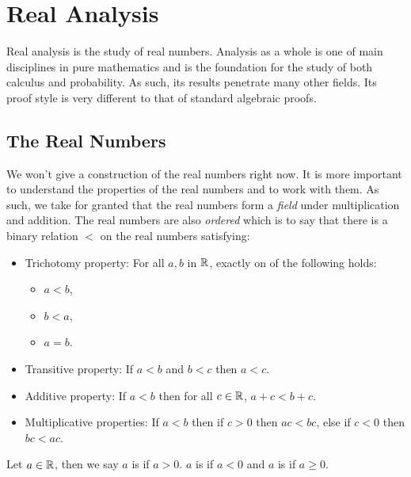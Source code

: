 \chapter{Real Analysis}\label{cha:intr-real-analys}

Real analysis is the study of real numbers. Analysis as a whole is one of main disciplines in pure mathematics and is the foundation for the study of both calculus and probability. As such, its results penetrate many other fields. Its proof style is very different to that of standard algebraic proofs.

\section{The Real Numbers}
We won't give a construction of the real numbers right now. It is more important to understand the properties of the real numbers and to work with them. As such, we take for granted that the real numbers form a \emph{field} under multiplication and addition. The real numbers are also \emph{ordered} which is to say that there is a binary relation \(<\) on the real numbers satisfying:

\begin{itemize}
\item Trichotomy property: For all \(a, b\) in \(\mathbb{R}\), exactly on of the following holds:
  \begin{itemize}
    \item \(a < b\),
    \item \(b < a\),
    \item \(a = b\).
  \end{itemize}

\item Transitive property: If \(a < b\) and \(b < c\) then \(a < c\).

\item Additive property: If \(a < b\) then for all \(c \in \mathbb{R}\), \(a + c < b + c\).

\item Multiplicative properties: If \(a < b\) then if \(c > 0\) then \(ac < bc\), else if \(c < 0\) then \(bc < ac\).
\end{itemize}

\begin{definition}
  Let \(a \in \mathbb{R}\), then we say \(a\) is  if \(a > 0\). \(a\) is  if \(a < 0\) and \(a\) is  if \(a \geq 0\).
\end{definition}


